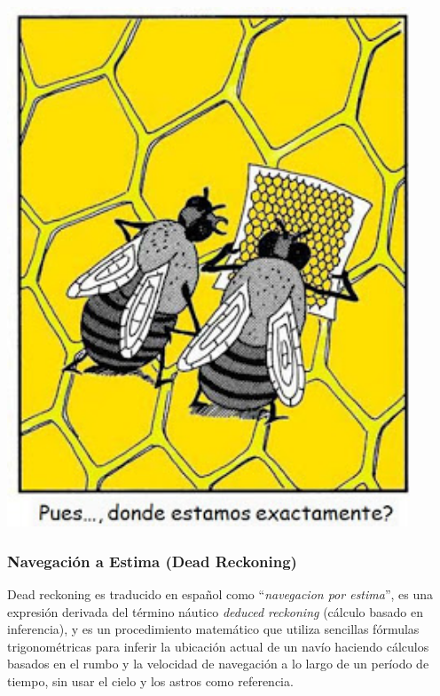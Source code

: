 \documentclass[a4paper,12pt,twoside]{article}
\begin{document}
\begin{minipage}[b]{0.350\linewidth}
\centering
\includegraphics[width=0.9\textwidth]{Imagenes/donde_estamos.jpg}  
\end{minipage}





\subsubsection{Navegaci\'on a Estima (Dead Reckoning) \cite{Salazar_nav_aerea}}

  Dead reckoning es traducido en espa\~nol como ``\textit{navegacion
    por estima}'', es una expresi\'on derivada del t\'ermino n\'autico
  \textit{deduced reckoning} (c\'alculo basado en inferencia), y es un
  procedimiento matem\'atico que utiliza sencillas f\'ormulas
  trigonom\'etricas para inferir la ubicaci\'on actual de un nav\'io
  haciendo c\'alculos basados en el rumbo y la velocidad de
  navegaci\'on a lo largo de un per\'iodo de tiempo, sin usar el cielo
  y los astros como referencia.
\end{document}
